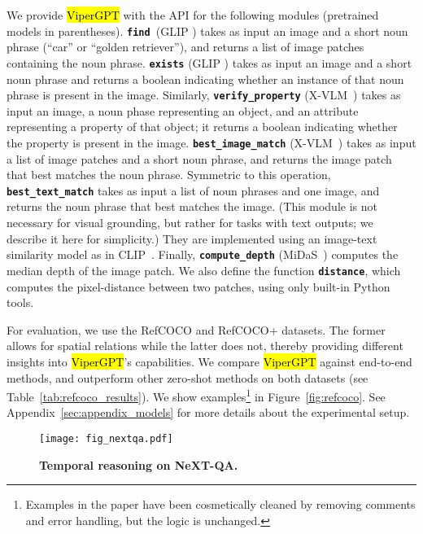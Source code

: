 \documentclass[10pt,twocolumn,letterpaper]{article}
\newcommand{\viper}[0]{{\small\fontfamily{txtt}\selectfont \textcolor{mygreen}{\hl{ViperGPT}}}\xspace}
\begin{document}
We provide \viper with the  API for the following modules (pretrained models in parentheses). \texttt{\textbf{find}}~({\footnotesize GLIP \cite{li2022grounded}}) takes as input an image and a short noun phrase (\eg ``car'' or ``golden retriever''), and returns a list of image patches containing the noun phrase. \texttt{\textbf{exists}} ({\footnotesize GLIP \cite{li2022grounded}}) takes as input an image and a short noun phrase and returns a boolean indicating whether an instance of that noun phrase is present in the image. Similarly, \texttt{\textbf{verify\_property}} ({\footnotesize X-VLM~\cite{zeng2021multi}}) takes as input an image, a noun phase representing an object, and an attribute representing a property of that object; it returns a boolean indicating whether the property is present in the image. \texttt{\textbf{best\_image\_match}} ({\footnotesize X-VLM~\cite{zeng2021multi}}) takes as input a list of image patches and a short noun phrase, and returns the image patch that best matches the noun phrase. Symmetric to this operation, \texttt{\textbf{best\_text\_match}} takes as input a list of noun phrases and one image, and returns the noun phrase that best matches the image. (This module is not necessary for visual grounding, but rather for tasks with text outputs; we describe it here for simplicity.) They are implemented using an image-text similarity model as in CLIP~\cite{radford2021learning}. Finally, \texttt{\textbf{compute\_depth}} ({\footnotesize MiDaS~\cite{Ranftl2022}}) computes the median depth of the image patch. 
We also define the function \texttt{\textbf{distance}}, which computes the pixel-distance between two patches, using only built-in Python tools.

For evaluation, we use the RefCOCO and RefCOCO+ datasets. The former allows for spatial relations while the latter does not, thereby providing different insights into \viper's capabilities. We compare \viper against end-to-end methods, and outperform other zero-shot methods on both datasets (see Table~\ref{tab:refcoco_results}). We show examples\footnote{Examples in the paper have been cosmetically cleaned by removing comments and error handling, but the logic is unchanged.} in Figure~\ref{fig:refcoco}.
See Appendix~\ref{sec:appendix_models} for more details about the experimental setup.

\begin{figure*}[t]
    \texttt{[image: fig\_nextqa.pdf]}
    \caption{\textbf{Temporal reasoning on NeXT-QA.}}
    \label{fig:nextqa}
\end{figure*}
\end{document}
